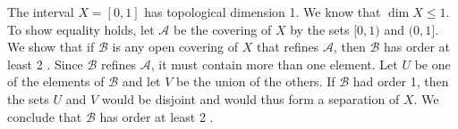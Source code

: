 \begin{centeredblock}
\begin{example}
\label{ex:\thesection.\theexample}
The interval \(X = [ {0,1}]\) has topological dimension 1. We know that \(\dim X \leq 1\). To show equality holds, let \(\mathcal{A}\) be the covering of \(X\) by the sets \([ {0,1})\) and \((0,1]\). We show that if \(\mathcal{B}\) is any open covering of \(X\) that refines \(\mathcal{A}\), then \(\mathcal{B}\) has order at least 2 . Since \(\mathcal{B}\) refines \(\mathcal{A}\), it must contain more than one element. Let \(U\) be one of the elements of \(\mathcal{B}\) and let \(V\) be the union of the others. If \(\mathcal{B}\) had order 1, then the sets \(U\) and \(V\) would be disjoint and would thus form a separation of \(X\). We conclude that \(\mathcal{B}\) has order at least 2 .
\end{example}
\end{centeredblock}

